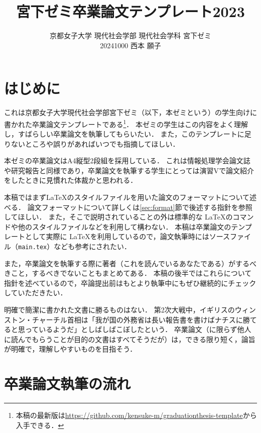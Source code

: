 \documentclass[a4paper,twocolumn,10pt]{jsarticle}
\title{宮下ゼミ卒業論文テンプレート2023}
\author{京都女子大学 現代社会学部 現代社会学科 宮下ゼミ\\
20241000 西本 願子}
\begin{document}
\maketitle

\section{はじめに}

これは京都女子大学現代社会学部宮下ゼミ（以下，本ゼミという）の学生向けに書かれた卒業論文テンプレートである\footnote{本稿の最新版は\url{https://github.com/kensuke-m/graduationthesis-template}から入手できる．}．
本ゼミの学生はこの内容をよく理解し，すばらしい卒業論文を執筆してもらいたい．
また，このテンプレートに足りないところや誤りがあればいつでも指摘してほしい．

本ゼミの卒業論文はA4縦型2段組を採用している．
これは情報処理学会論文誌や研究報告と同様であり，卒業論文を執筆する学生にとっては演習Vで論文紹介をしたときに見慣れた体裁かと思われる．

本稿ではまず\LaTeX のスタイルファイルを用いた論文のフォーマットについて述べる．
論文フォーマットについて詳しくは\ref{sec:format}節で後述する指針を参照してほしい．
また，そこで説明されていることの外は標準的な \LaTeX のコマンドや他のスタイルファイルなどを利用して構わない．
本稿は卒業論文のテンプレートとして実際に \LaTeX を利用しているので，論文執筆時にはソースファイル（{\tt main.tex}）なども参考にされたい．

また，卒業論文を執筆する際に著者（これを読んでいるあなたである）がするべきこと，するべきでないこともまとめてある．
本稿の後半ではこれらについて指針を述べているので，卒論提出前はもとより執筆中にもぜひ継続的にチェックしていただきたい．

明確で簡潔に書かれた文書に勝るものはない．
第2次大戦中，イギリスのウィンストン・チャーチル首相は「我が国の外務省は長い報告書を書けばナチスに勝てると思っているようだ」としばしばこぼしたという\cite{newsweek2021}．
卒業論文（に限らず他人に読んでもらうことが目的の文書はすべてそうだが）は，できる限り短く，論旨が明確で，理解しやすいものを目指そう．

\section{卒業論文執筆の流れ}
\end{document}
